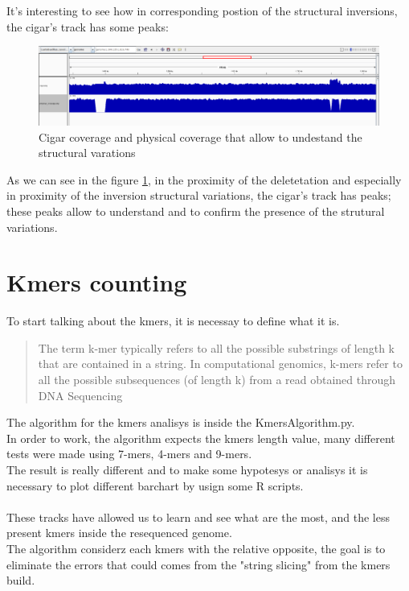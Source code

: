 It's interesting to see how in corresponding postion of the structural inversions, the cigar's track has some peaks:

 \begin{figure}[H]
				\centering
				\includegraphics[scale=0.45]{immagini/cigar_coverage_2.png}
				\caption{Cigar coverage and physical coverage that allow to undestand the structural varations}\label{fig:16}
				\end{figure}	
As we can see in the figure \ref{fig:16}, in the proximity of the deletetation and especially in proximity of the inversion structural variations, the cigar's track has peaks; these peaks allow to understand and to confirm the presence of the strutural variations.		

						
\section{Kmers counting}
To start talking about the kmers, it is necessay to define what it is.
\begin{quote}
The term k-mer typically refers to all the possible substrings of length k that are contained in a string. In computational genomics, k-mers refer to all the possible subsequences (of length k) from a read obtained through DNA Sequencing
\end{quote}

The algorithm for the kmers analisys is inside the KmersAlgorithm.py.\\
In order to work, the algorithm expects the kmers length value, many different tests were made using 7-mers, 4-mers and 9-mers.\\
The result is really different and to make some hypotesys or analisys it is necessary to plot different barchart by usign some R scripts.\\\\

These tracks have allowed us to learn and see what are the most, and the less present kmers inside the resequenced genome.\\

The algorithm considerz each kmers with the relative opposite, the goal is to eliminate the errors that could comes from the "string slicing" from the kmers build.\\\\

